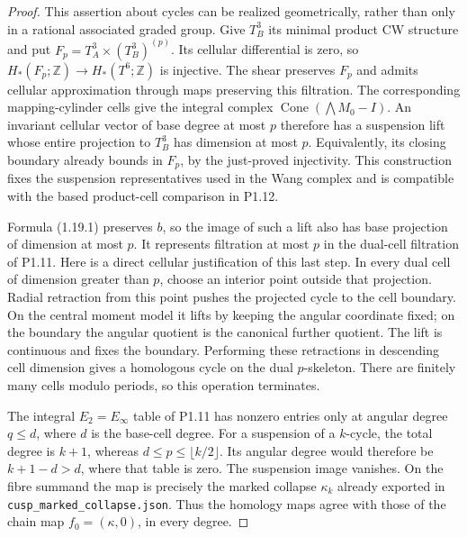 \begin{proof}
This assertion about cycles can be realized geometrically, rather
than only in a rational associated graded group.  Give $T_B^3$ its
minimal product CW structure and put
$F_p=T_A^3\times(T_B^3)^{(p)}$.
Its cellular differential is zero, so
$H_*(F_p;\mathbb Z)\to H_*(T^6;\mathbb Z)$ is injective.
The shear preserves $F_p$ and admits cellular approximation through
maps preserving this filtration.  The corresponding mapping-cylinder
cells give the integral complex
$\operatorname{Cone}(\bigwedge M_0-I)$.
An invariant cellular vector of base degree at most $p$ therefore
has a suspension lift whose entire projection to $T_B^3$ has dimension
at most $p$.  Equivalently, its closing boundary already bounds in
$F_p$, by the just-proved injectivity.  This construction fixes the
suspension representatives used in the Wang complex and is compatible
with the based product-cell comparison in P1.12.

Formula (1.19.1) preserves $b$, so the image of such a lift also has
base projection of dimension at most $p$.  It represents filtration
at most $p$ in the dual-cell filtration of P1.11.  Here is a direct
cellular justification of this last step.  In every dual cell of
dimension greater than $p$, choose an interior point outside that
projection.  Radial retraction from this point pushes the projected
cycle to the cell boundary.  On the central moment model it lifts
by keeping the angular coordinate fixed; on the boundary the angular
quotient is the canonical further quotient.  The lift is continuous
and fixes the boundary.  Performing these retractions in descending
cell dimension gives a homologous cycle on the dual $p$-skeleton.
There are finitely many cells modulo periods, so this operation
terminates.

The integral $E_2=E_\infty$ table of P1.11 has nonzero entries only
at angular degree $q\leq d$, where $d$ is the base-cell degree.
For a suspension of a $k$-cycle, the total degree is $k+1$, whereas
$d\leq p\leq\lfloor k/2\rfloor$. Its angular degree would therefore
be $k+1-d>d$, where that table is zero.  The suspension image
vanishes.  On the fibre summand the map is precisely the marked
collapse $\kappa_k$ already exported in
\texttt{cusp\_marked\_collapse.json}.  Thus the homology maps agree
with those of the chain map $f_0=(\kappa,0)$, in every degree.


\end{proof}
